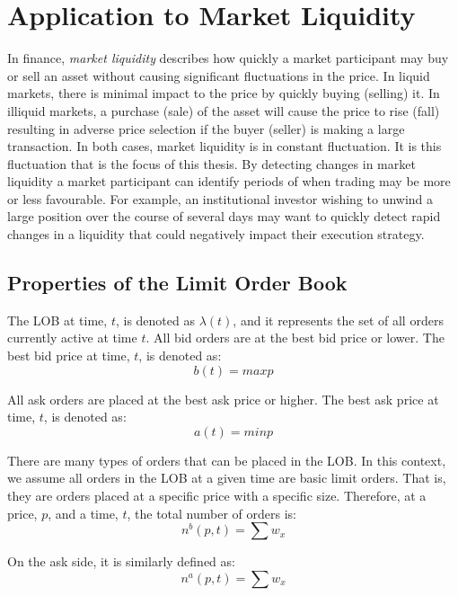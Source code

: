 \chapter{Application to Market Liquidity}

In finance, \textit{market liquidity} describes how quickly a market participant may buy or sell an asset without causing significant fluctuations in the price. In liquid markets, there is minimal impact to the price by quickly buying (selling) it. In illiquid markets, a purchase (sale) of the asset will cause the price to rise (fall) resulting in adverse price selection if the buyer (seller) is making a large transaction. In both cases, market liquidity is in constant fluctuation. It is this fluctuation that is the focus of this thesis. 
By detecting changes in market liquidity a market participant can identify periods of when trading may be more or less favourable. For example, an institutional investor wishing to unwind a large position over the course of several days may want to quickly detect rapid changes in a liquidity that could negatively impact their execution strategy.

\section{Properties of the Limit Order Book}

The LOB at time, $t$, is denoted as $\lambda(t)$, and it represents the set of all orders currently active at time $t$. All bid orders are at the best bid price or lower. The best bid price at time, $t$,  is denoted as:
\begin{equation}
b(t) = max p
\end{equation}

All ask orders are placed at the best ask price or higher. The best ask price at time, $t$, is denoted as:
\begin{equation}
a(t) = min p
\end{equation}

There are many types of orders that can be placed in the LOB. In this context, we assume all orders in the LOB at a given time are basic limit orders. That is, they are orders placed at a specific price with a specific size. Therefore, at a price, $p$, and a time, $t$, the total number of orders is:
\begin{equation}
n^b(p, t) = \sum w_x
\end{equation}

On the ask side, it is similarly defined as:
\begin{equation}
n^a(p, t) = \sum w_x
\end{equation}

